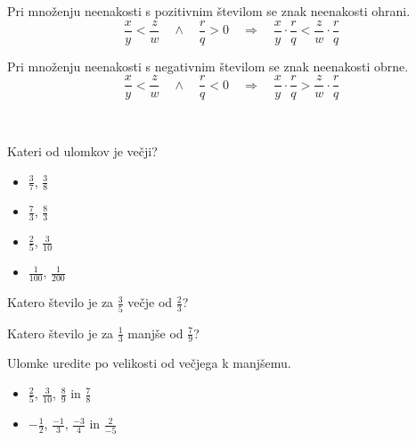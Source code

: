                     Pri množenju neenakosti s pozitivnim številom se znak neenakosti ohrani.
                    $$ \dfrac{x}{y}<\dfrac{z}{w} \quad \wedge \quad \dfrac{r}{q}>0 \quad \Rightarrow \quad \dfrac{x}{y}\cdot\dfrac{r}{q}<\dfrac{z}{w}\cdot\dfrac{r}{q} $$

                    

                    Pri množenju neenakosti s negativnim številom se znak neenakosti obrne.
                    $$ \dfrac{x}{y}<\dfrac{z}{w} \quad \wedge \quad \dfrac{r}{q}<0 \quad \Rightarrow \quad \dfrac{x}{y}\cdot\dfrac{r}{q}>\dfrac{z}{w}\cdot\dfrac{r}{q} $$

                    

                    ~
                    \begin{naloga}
                        Kateri od ulomkov je večji?
                        \begin{itemize}
                            \item $\frac{3}{7}$, $\frac{3}{8}$ 
                            \item $\frac{7}{3}$, $\frac{8}{3}$ 
                            \item $\frac{2}{5}$, $\frac{3}{10}$ 
                            \item $\frac{1}{100}$, $\frac{1}{200}$ 
                        \end{itemize}
                    \end{naloga}
        
                    \begin{naloga}
                        Katero število je za $\frac{3}{5}$ večje od $\frac{2}{3}$?
                        
                    \end{naloga}
        
                    \begin{naloga}
                        Katero število je za $\frac{1}{3}$ manjše od $\frac{7}{9}$?
                        
                    \end{naloga}
        
                    \begin{naloga}
                        Ulomke uredite po velikosti od večjega k manjšemu.
                        \begin{itemize}
                            \item $\frac{2}{5}$, $\frac{3}{10}$, $\frac{8}{9}$ in $\frac{7}{8}$ 
                            \item $-\frac{1}{2}$, $\frac{-1}{3}$, $\frac{-3}{4}$ in $\frac{2}{-5}$ 
                        \end{itemize}
                    \end{naloga}
        
